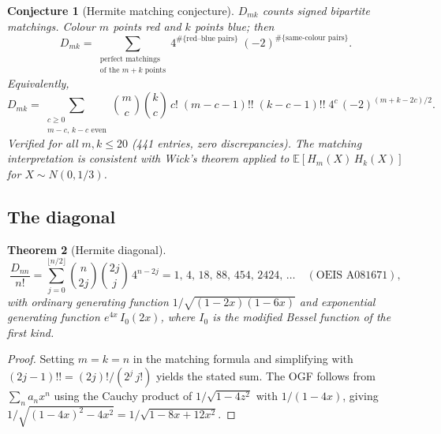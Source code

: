 \documentclass[11pt,a4paper]{article}
\theoremstyle{plain}
\newtheorem{theorem}{Theorem}[section]
\newtheorem{conjecture}[theorem]{Conjecture}
\theoremstyle{definition}
\begin{document}
\begin{tcolorbox}[colback=blue!5, colframe=blue!5, boxrule=0pt,
  sharp corners]
\begin{conjecture}[Hermite matching conjecture]\label{conj:hermite}
$D_{mk}$ counts signed bipartite matchings. Colour $m$ points red
and $k$ points blue; then
\[
  D_{mk} = \sum_{\substack{\text{perfect matchings}\\
  \text{of the } m+k \text{ points}}}
  4^{\#\{\text{red--blue pairs}\}} \; (-2)^{\#\{\text{same-colour pairs}\}}.
\]
Equivalently,
\[
  D_{mk} = \sum_{\substack{c \ge 0 \\ m - c,\, k - c \text{ even}}}
  \binom{m}{c}\binom{k}{c}\, c!\;
  (m{-}c{-}1)!!\; (k{-}c{-}1)!!\; 4^{c}\, (-2)^{(m+k-2c)/2}.
\]
Verified for all $m, k \le 20$ (441 entries, zero discrepancies).
The matching interpretation is consistent with Wick's theorem applied
to $\mathbb{E}[H_m(X)\, H_k(X)]$ for $X \sim N(0, 1/3)$.
\end{conjecture}
\end{tcolorbox}

\subsection{The diagonal}

\begin{tcolorbox}[colback=black!5, colframe=black!5, boxrule=0pt,
  sharp corners]
\begin{theorem}[Hermite diagonal]\label{thm:hermite-diag}
\begin{equation}\label{eq:hermite-diag}
  \frac{D_{nn}}{n!} = \sum_{j=0}^{\lfloor n/2 \rfloor}
  \binom{n}{2j}\binom{2j}{j}\, 4^{n-2j}
  = 1,\, 4,\, 18,\, 88,\, 454,\, 2424,\, \ldots
  \quad (\text{OEIS A081671}),
\end{equation}
with ordinary generating function
$1/\sqrt{(1-2x)(1-6x)}$
and exponential generating function $e^{4x}\, I_0(2x)$, where $I_0$
is the modified Bessel function of the first kind.
\end{theorem}
\end{tcolorbox}

\begin{proof}
Setting $m = k = n$ in the matching formula and simplifying with
$(2j-1)!! = (2j)!/(2^j\, j!)$ yields the stated sum. The OGF
follows from $\sum_n a_n x^n$ using the Cauchy product of
$1/\sqrt{1-4z^2}$ with $1/(1-4x)$, giving
$1/\sqrt{(1-4x)^2 - 4x^2} = 1/\sqrt{1 - 8x + 12x^2}$.
\end{proof}
\end{document}
